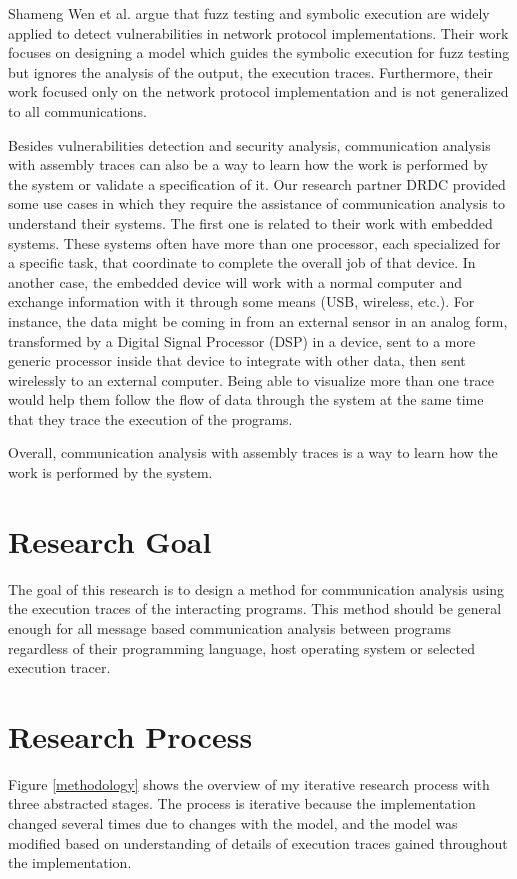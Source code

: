 Shameng Wen et al. argue that fuzz testing and symbolic execution are widely applied to detect vulnerabilities in network protocol implementations. Their work focuses on designing a model which guides the symbolic execution for fuzz testing \cite{wen2017model} but ignores the analysis of the output, the execution traces. Furthermore, their work focused only on the network protocol implementation and is not generalized to all communications.

Besides vulnerabilities detection and security analysis, communication analysis with assembly traces can also be a way to learn how the work is performed by the system or validate a specification of it. Our research partner DRDC provided some use cases in which they require the assistance of communication analysis to understand their systems. The first one is related to their work with embedded systems. These systems often have more than one processor, each specialized for a specific task, that coordinate to complete the overall job of that device.  In another case, the embedded device will work with a normal computer and exchange information with it through some means
(USB, wireless, etc.).  For instance, the data might be coming in from an external sensor in an analog form, transformed by a Digital Signal Processor (DSP) in a device, sent to a more generic processor inside that device to integrate with other data, then sent wirelessly to an external computer. Being able to visualize more than one trace would help them follow the flow of data through the system at the same time that they trace the execution of the programs.

Overall, communication analysis with assembly traces is a way to learn how the work is performed by the system. 

\section{Research Goal}
The goal of this research is to design a method for communication analysis using the execution traces of the interacting programs. This method should be general enough for all message based communication analysis between programs regardless of their programming language, host operating system or selected execution tracer. 

\section{Research Process}
Figure \ref{methodology} shows the overview of my iterative research process with three abstracted stages. The process is iterative because the implementation changed several times due to changes with the model, and the model was modified based on understanding of details of execution traces gained throughout the implementation. 

